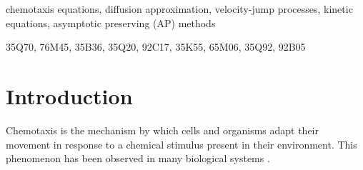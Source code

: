 \documentclass[review,onefignum,onetabnum]{siamart220329}
\begin{document}
\maketitle

\begin{abstract}
In this work we first prove, by formal arguments, that the diffusion limit of nonlinear kinetic equations, where both the \textit{transport term and the turning operator are density-dependent}, leads to volume-exclusion chemotactic equations. \textcolor{red}{Our main contribution is} an asymptotic preserving scheme for such nonlinear kinetic equations based on a micro-macro decomposition. By properly discretizing the nonlinear term implicitly-explicitly in an upwind manner, the scheme produces accurate approximations also in the case of strong chemosensitivity. We show, via detailed calculations, that the scheme is asymptotic preserving and {{bound preserving}} and show numerically an {energy dissipation} property, which are essential for practical applications. We extend this scheme to two dimensional kinetic models and we  validate its efficiency by means of 1D and 2D numerical experiments of pattern formation in biological systems.
\end{abstract}

\begin{keywords}
chemotaxis equations, diffusion approximation, velocity-jump processes,
kinetic equations, asymptotic preserving (AP) methods
\end{keywords}

\begin{MSCcodes}
35Q70, 76M45, 35B36, 35Q20, 92C17, 35K55, 65M06, 35Q92, 92B05
\end{MSCcodes}

\section{Introduction}
Chemotaxis is the mechanism by which cells and organisms adapt their movement in response to a chemical stimulus present in their environment. This phenomenon has been observed in many biological systems \cite{Alt1980,Kaupp2012,Jin2008,Roussos2011}. 
\end{document}

